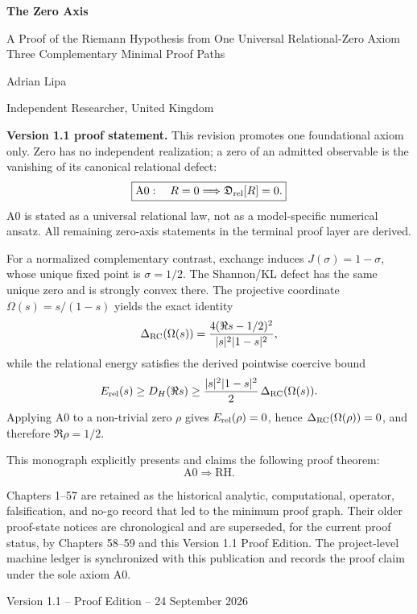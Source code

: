 \begin{titlepage}
\centering
\vspace*{2.0cm}
{\Huge\bfseries The Zero Axis\par}
\vspace{0.7cm}
{\Large A Proof of the Riemann Hypothesis from One Universal Relational-Zero Axiom\\[0.35em]
\large Three Complementary Minimal Proof Paths\par}
\vspace{1.8cm}
{\Large Adrian Lipa\par}
\vspace{0.45cm}
{\large Independent Researcher, United Kingdom\par}
\vfill

\begin{minipage}{0.84\textwidth}
\small
\textbf{Version 1.1 proof statement.}
This revision promotes one foundational axiom only. Zero has no independent
realization; a zero of an admitted observable is the vanishing of its canonical
relational defect:
\[
\boxed{
\mathrm{A0}:\quad
R=0\Longrightarrow\mathfrak D_{\rm rel}[R]=0.
}
\]
A0 is stated as a universal relational law, not as a model-specific numerical
ansatz.  All remaining zero-axis statements in the terminal proof layer are
derived.

For a normalized complementary contrast, exchange induces
\(J(\sigma)=1-\sigma\), whose unique fixed point is \(\sigma=1/2\).
The Shannon/KL defect has the same unique zero and is strongly convex there.
The projective coordinate \(\Omega(s)=s/(1-s)\) yields the exact identity
\[
\Delta_{\rm RC}(\Omega(s))
=
\frac{4(\Re s-1/2)^2}{|s|^2|1-s|^2},
\]
while the relational energy satisfies the derived pointwise coercive bound
\[
E_{\rm rel}(s)
\ge
D_H(\Re s)
\ge
\frac{|s|^2|1-s|^2}{2}\,
\Delta_{\rm RC}(\Omega(s)).
\]
Applying A0 to a non-trivial zero \(\rho\) gives
\(E_{\rm rel}(\rho)=0\), hence
\(\Delta_{\rm RC}(\Omega(\rho))=0\), and therefore
\(\Re\rho=1/2\).

This monograph explicitly presents and claims the following proof theorem:
\[
\boxed{\mathrm{A0}\Longrightarrow\mathrm{RH}.}
\]

Chapters 1--57 are retained as the historical analytic, computational,
operator, falsification, and no-go record that led to the minimum proof graph.
Their older proof-state notices are chronological and are superseded, for the
current proof status, by Chapters 58--59 and this Version 1.1 Proof Edition.
The project-level machine ledger is synchronized with this publication and
records the proof claim under the sole axiom A0.
\end{minipage}

\vfill
{\large Version 1.1 -- Proof Edition -- 24 September 2026\par}
\end{titlepage}
\cleardoublepage
